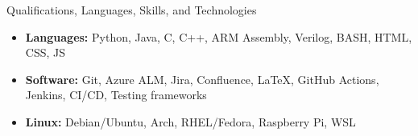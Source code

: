 \documentclass[]{mcdowellcv}
\begin{document}
	\makeheader
		\begin{cvsection}{Qualifications, Languages, Skills, and Technologies}
		\begin{cvsubsection}{}{}{}	
			\begin{itemize}
					\item \textbf{Languages:} Python, Java, C, C++, ARM Assembly, Verilog, BASH, HTML, CSS, JS
					\item \textbf{Software:} Git, Azure ALM, Jira, Confluence, \LaTeX, GitHub Actions, Jenkins, CI/CD, Testing frameworks
					\item \textbf{Linux:} Debian/Ubuntu, Arch, RHEL/Fedora, Raspberry Pi, WSL
			\end{itemize}
		\end{cvsubsection}
	\end{cvsection}
\end{document}
